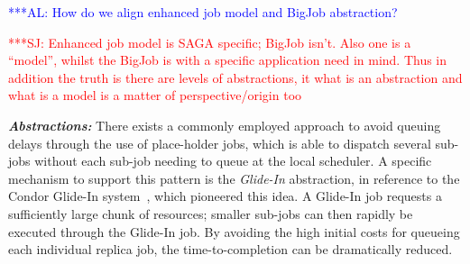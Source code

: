 \documentclass{rspublic}
\newcommand{\alnote}[1]{ {\textcolor{blue} { ***AL: #1 }}}
\newcommand{\jhanote}[1]{ {\textcolor{red} { ***SJ: #1 }}}
\newcommand{\alnote}[1]{}
\newcommand{\jhanote}[1]{}
\newcommand{\I}[1]{\textit{#1}}
\begin{document}
\alnote{How do we align enhanced job model and BigJob abstraction?}

\jhanote{Enhanced job model is SAGA specific; BigJob isn't. Also one
  is a ``model'', whilst the BigJob is with a specific application
  need in mind. Thus in addition the truth is there are levels of
  abstractions, it what is an abstraction and what is a model is a
  matter of perspective/origin too}              


{\noindent \it \bf Abstractions:} There exists a commonly employed approach to
avoid queuing delays through the use of place-holder jobs, which is
able to dispatch several sub-jobs without each sub-job needing to
queue at the local scheduler. A specific mechanism to support this
pattern is the \emph{Glide-In} abstraction, in reference to the Condor
Glide-In system~\citep{citeulike:291860}, which pioneered this idea. A
Glide-In job requests a sufficiently large chunk of resources; smaller
sub-jobs can then rapidly be executed through the Glide-In job.  By
avoiding the high initial costs for queueing each individual replica
job, the time-to-completion can be dramatically reduced.
\end{document}
